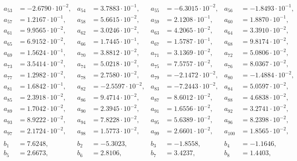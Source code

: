 \begin{align*}
a_{ 53 } &= -2.6790 \cdot 10^{ -2 }, & a_{ 54 } &= 3.7883 \cdot 10^{ -1 }, & a_{ 55 } &= -6.3015 \cdot 10^{ -2 }, & a_{ 56 } &= -1.8493 \cdot 10^{ -1 },\\ 
a_{ 57 } &= 1.2167 \cdot 10^{ -1 }, & a_{ 58 } &= 5.6615 \cdot 10^{ -2 }, & a_{ 59 } &= 2.1208 \cdot 10^{ -1 }, & a_{ 60 } &= 1.8870 \cdot 10^{ -1 },\\ 
a_{ 61 } &= 9.9565 \cdot 10^{ -2 }, & a_{ 62 } &= 3.0246 \cdot 10^{ -2 }, & a_{ 63 } &= 4.2065 \cdot 10^{ -2 }, & a_{ 64 } &= 3.3910 \cdot 10^{ -2 },\\ 
a_{ 65 } &= 6.9152 \cdot 10^{ -2 }, & a_{ 66 } &= 1.7445 \cdot 10^{ -1 }, & a_{ 67 } &= 1.5787 \cdot 10^{ -1 }, & a_{ 68 } &= 9.8174 \cdot 10^{ -2 },\\ 
a_{ 69 } &= 1.5624 \cdot 10^{ -1 }, & a_{ 70 } &= 3.8812 \cdot 10^{ -2 }, & a_{ 71 } &= 3.1369 \cdot 10^{ -2 }, & a_{ 72 } &= 5.0806 \cdot 10^{ -2 },\\ 
a_{ 73 } &= 3.5414 \cdot 10^{ -2 }, & a_{ 74 } &= 5.0218 \cdot 10^{ -2 }, & a_{ 75 } &= 7.5757 \cdot 10^{ -2 }, & a_{ 76 } &= 8.0367 \cdot 10^{ -2 },\\ 
a_{ 77 } &= 1.2982 \cdot 10^{ -2 }, & a_{ 78 } &= 2.7580 \cdot 10^{ -2 }, & a_{ 79 } &= -2.1472 \cdot 10^{ -2 }, & a_{ 80 } &= -1.4884 \cdot 10^{ -2 },\\ 
a_{ 81 } &= 1.6842 \cdot 10^{ -1 }, & a_{ 82 } &= -2.5597 \cdot 10^{ -2 }, & a_{ 83 } &= -7.2443 \cdot 10^{ -2 }, & a_{ 84 } &= 5.0597 \cdot 10^{ -2 },\\ 
a_{ 85 } &= 2.3918 \cdot 10^{ -2 }, & a_{ 86 } &= 9.4714 \cdot 10^{ -2 }, & a_{ 87 } &= 8.6012 \cdot 10^{ -2 }, & a_{ 88 } &= 4.6838 \cdot 10^{ -2 },\\ 
a_{ 89 } &= 1.7042 \cdot 10^{ -2 }, & a_{ 90 } &= 2.3945 \cdot 10^{ -2 }, & a_{ 91 } &= 1.6556 \cdot 10^{ -2 }, & a_{ 92 } &= 3.2741 \cdot 10^{ -2 },\\ 
a_{ 93 } &= 8.9222 \cdot 10^{ -2 }, & a_{ 94 } &= 7.8228 \cdot 10^{ -2 }, & a_{ 95 } &= 5.6389 \cdot 10^{ -2 }, & a_{ 96 } &= 8.2398 \cdot 10^{ -2 },\\ 
a_{ 97 } &= 2.1724 \cdot 10^{ -2 }, & a_{ 98 } &= 1.5773 \cdot 10^{ -2 }, & a_{ 99 } &= 2.6601 \cdot 10^{ -2 }, & a_{ 100 } &= 1.8565 \cdot 10^{ -2 },\\ 
&&&&&&& \\ 
b_{ 1 } &= 7.6248, & b_{ 2 } &= -5.3023, & b_{ 3 } &= -1.8558, & b_{ 4 } &= -1.1646,\\ 
b_{ 5 } &= 2.6673, & b_{ 6 } &= 2.8106, & b_{ 7 } &= 3.4237, & b_{ 8 } &= 1.4403,\\ 

\end{align*}
